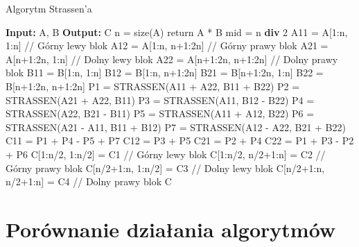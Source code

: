 \documentclass[11pt, leqno]{scrartcl}
\begin{document}
    \begin{algorithm}[H]
        \caption{Algorytm Strassen'a}
        \begin{algorithmic}
            \State \textbf{Input:} A, B
            \State \textbf{Output:} C
                \State n = size(A)
                    \State return A * B
                \EndIf
                \State
                \State mid = n \textbf{div} 2
                \State A11 = A[1:n, 1:n]       // Górny lewy blok
                \State A12 = A[1:n, n+1:2n]    // Górny prawy blok
                \State A21 = A[n+1:2n, 1:n]    // Dolny lewy blok
                \State A22 = A[n+1:2n, n+1:2n] // Dolny prawy blok
                \State B11 = B[1:n, 1:n]
                \State B12 = B[1:n, n+1:2n]
                \State B21 = B[n+1:2n, 1:n]
                \State B22 = B[n+1:2n, n+1:2n]
                \State
                \State P1 = STRASSEN(A11 + A22, B11 + B22)
                \State P2 = STRASSEN(A21 + A22, B11)
                \State P3 = STRASSEN(A11, B12 - B22)
                \State P4 = STRASSEN(A22, B21 - B11)
                \State P5 = STRASSEN(A11 + A12, B22)
                \State P6 = STRASSEN(A21 - A11, B11 + B12)
                \State P7 = STRASSEN(A12 - A22, B21 + B22)
                \State
                \State C11 = P1 + P4 - P5 + P7
                \State C12 = P3 + P5
                \State C21 = P2 + P4
                \State C22 = P1 + P3 - P2 + P6
                \State
                \State C[1:n/2, 1:n/2] = C1      // Górny lewy blok
                \State C[1:n/2, n/2+1:n] = C2    // Górny prawy blok
                \State C[n/2+1:n, 1:n/2] = C3    // Dolny lewy blok
                \State C[n/2+1:n, n/2+1:n] = C4  // Dolny prawy blok
                \State \Return C
            \EndFunction
        \end{algorithmic}
    \end{algorithm}

    \section{Porównanie działania algorytmów}
\end{document}
